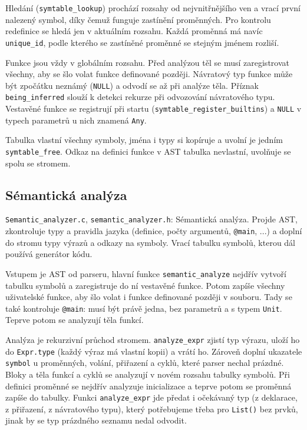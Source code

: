 \documentclass[11pt, a4paper]{article}
\begin{document}
Hledání (\texttt{symtable\_lookup}) prochází rozsahy od nejvnitřnějšího ven a vrací první nalezený symbol, díky čemuž funguje zastínění proměnných. Pro kontrolu redefinice se hledá jen v aktuálním rozsahu. Každá proměnná má navíc \texttt{unique\_id}, podle kterého se zastíněné proměnné se stejným jménem rozliší.

Funkce jsou vždy v globálním rozsahu. Před analýzou těl se musí zaregistrovat všechny, aby se šlo volat funkce definované později. Návratový typ funkce může být zpočátku neznámý (\texttt{NULL}) a odvodí se až při analýze těla. Příznak \texttt{being\_inferred} slouží k detekci rekurze při odvozování návratového typu. Vestavěné funkce se registrují při startu (\texttt{symtable\_register\_builtins}) a \texttt{NULL} v typech parametrů u nich znamená \texttt{Any}.

Tabulka vlastní všechny symboly, jména i typy si kopíruje a uvolní je jedním \texttt{symtable\_free}. Odkaz na definici funkce v AST tabulka nevlastní, uvolňuje se spolu se stromem.

\subsection{Sémantická analýza}

\texttt{Semantic\_analyzer.c}, \texttt{semantic\_analyzer.h}: Sémantická analýza. Projde AST, zkontroluje typy a pravidla jazyka (definice, počty argumentů, \texttt{@main}, ...) a doplní do stromu typy výrazů a odkazy na symboly. Vrací tabulku symbolů, kterou dál používá generátor kódu.

Vstupem je AST od parseru, hlavní funkce \texttt{semantic\_analyze} nejdřív vytvoří tabulku symbolů a zaregistruje do ní vestavěné funkce. Potom zapíše všechny uživatelské funkce, aby šlo volat i funkce definované později v souboru. Tady se také kontroluje \texttt{@main}: musí být právě jedna, bez parametrů a s typem \texttt{Unit}. Teprve potom se analyzují těla funkcí.

Analýza je rekurzivní průchod stromem. \texttt{analyze\_expr} zjistí typ výrazu, uloží ho do \texttt{Expr.type} (každý výraz má vlastní kopii) a vrátí ho. Zároveň doplní ukazatele \texttt{symbol} u proměnných, volání, přiřazení a cyklů, které parser nechal prázdné. Bloky a těla funkcí a cyklů se analyzují v novém rozsahu tabulky symbolů. Při definici proměnné se nejdřív analyzuje inicializace a teprve potom se proměnná zapíše do tabulky. Funkci \texttt{analyze\_expr} jde předat i očekávaný typ (z deklarace, z přiřazení, z návratového typu), který potřebujeme třeba pro \texttt{List()} bez prvků, jinak by se typ prázdného seznamu nedal odvodit.
\end{document}
